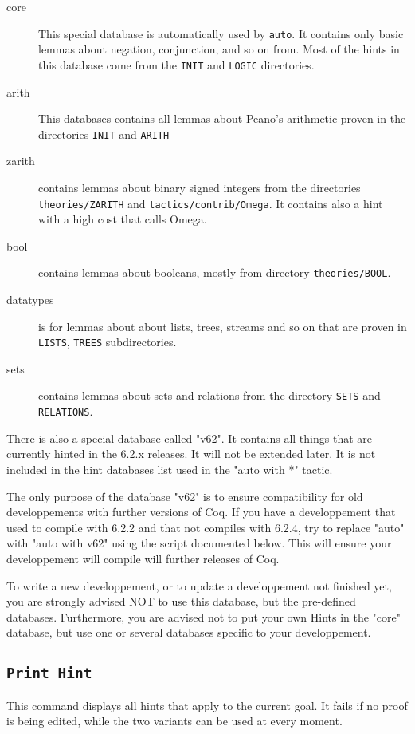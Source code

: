 \begin{description}
\item[core] This special database is automatically used by
  \texttt{auto}. It contains only basic lemmas about negation,
  conjunction, and so on from. Most of the hints in this database come 
  from the \texttt{INIT} and \texttt{LOGIC} directories.

\item[arith] This databases contains all lemmas about Peano's
  arithmetic proven in the directories \texttt{INIT} and
  \texttt{ARITH}

\item[zarith] contains lemmas about binary signed integers from the
  directories \texttt{theories/ZARITH} and
  \texttt{tactics/contrib/Omega}. It contains also a hint with a high
  cost that calls Omega.

\item[bool] contains lemmas about booleans, mostly from directory
  \texttt{theories/BOOL}.

\item[datatypes] is for lemmas about about lists, trees, streams and so on that 
  are proven in \texttt{LISTS}, \texttt{TREES} subdirectories.

\item[sets] contains lemmas about sets and relations from the 
  directory \texttt{SETS} and \texttt{RELATIONS}.
\end{description}

There is also a special database called "v62". It contains all things that are
currently hinted in the 6.2.x releases. It will not be extended later. It is
not included in the hint databases list used in the "auto with *" tactic.

The only purpose of the database "v62" is to ensure compatibility for
old developpements with further versions of Coq. 
If you have a developpement that used to compile with 6.2.2 and that not
compiles with 6.2.4, try to replace "auto" with "auto with v62" using the
script documented below. This will ensure your developpement will compile
will further releases of Coq.

To write a new developpement, or to update a developpement not finished yet, 
you are strongly advised NOT to use this database, but the pre-defined
databases. Furthermore, you are advised not to put your own Hints in the
"core" database, but use one or several databases specific to your
developpement.

\subsection{\tt Print Hint}
\label{PrintHint}
This command displays all hints that apply to the current goal. It
fails if no proof is being edited, while the two variants can be used at
every moment.

